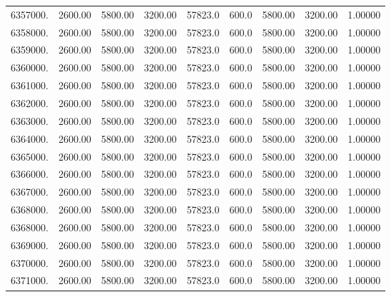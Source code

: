 {\begin{tabular}{rrrrrrrrr}
6357000. & 2600.00 & 5800.00 & 3200.00 & 57823.0   & 600.0 & 5800.00 & 3200.00 & 1.00000 \\
6358000. & 2600.00 & 5800.00 & 3200.00 & 57823.0   & 600.0 & 5800.00 & 3200.00 & 1.00000 \\
6359000. & 2600.00 & 5800.00 & 3200.00 & 57823.0   & 600.0 & 5800.00 & 3200.00 & 1.00000 \\
6360000. & 2600.00 & 5800.00 & 3200.00 & 57823.0   & 600.0 & 5800.00 & 3200.00 & 1.00000 \\
6361000. & 2600.00 & 5800.00 & 3200.00 & 57823.0   & 600.0 & 5800.00 & 3200.00 & 1.00000 \\
6362000. & 2600.00 & 5800.00 & 3200.00 & 57823.0   & 600.0 & 5800.00 & 3200.00 & 1.00000 \\
6363000. & 2600.00 & 5800.00 & 3200.00 & 57823.0   & 600.0 & 5800.00 & 3200.00 & 1.00000 \\
6364000. & 2600.00 & 5800.00 & 3200.00 & 57823.0   & 600.0 & 5800.00 & 3200.00 & 1.00000 \\
6365000. & 2600.00 & 5800.00 & 3200.00 & 57823.0   & 600.0 & 5800.00 & 3200.00 & 1.00000 \\
6366000. & 2600.00 & 5800.00 & 3200.00 & 57823.0   & 600.0 & 5800.00 & 3200.00 & 1.00000 \\
6367000. & 2600.00 & 5800.00 & 3200.00 & 57823.0   & 600.0 & 5800.00 & 3200.00 & 1.00000 \\
6368000. & 2600.00 & 5800.00 & 3200.00 & 57823.0   & 600.0 & 5800.00 & 3200.00 & 1.00000 \\
6368000. & 2600.00 & 5800.00 & 3200.00 & 57823.0   & 600.0 & 5800.00 & 3200.00 & 1.00000 \\
6369000. & 2600.00 & 5800.00 & 3200.00 & 57823.0   & 600.0 & 5800.00 & 3200.00 & 1.00000 \\
6370000. & 2600.00 & 5800.00 & 3200.00 & 57823.0   & 600.0 & 5800.00 & 3200.00 & 1.00000 \\
6371000. & 2600.00 & 5800.00 & 3200.00 & 57823.0   & 600.0 & 5800.00 & 3200.00 & 1.00000 \\
\end{tabular}
}
